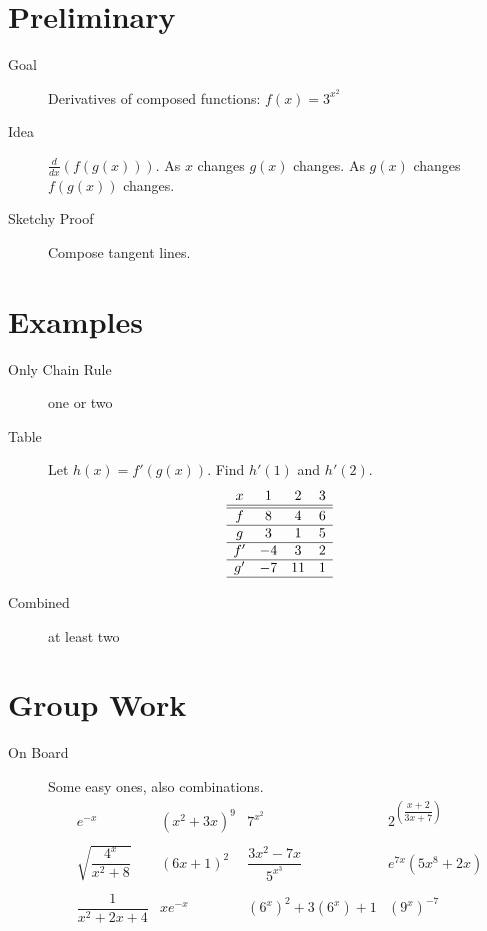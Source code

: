 \documentclass[11pt]{article}
\newcommand{\ds}{\displaystyle}
\begin{document}
\drawtitle

\section*{Preliminary}
\begin{description}
\item[Goal] Derivatives of composed functions: $f(x)=3^{x^2}$
\item[Idea] $\ds\frac{d}{dx}(f(g(x)))$.  As $x$ changes $g(x)$
  changes.  As $g(x)$ changes $f(g(x))$ changes.
\item[Sketchy Proof] Compose tangent lines.
\end{description}

\section*{Examples}
\begin{description}
\item[Only Chain Rule] one or two
\item[Table]   Let $h(x) = f'(g(x))$. Find $h'(1)$ and $h'(2)$.
  \[
  \begin{array}{cccc}
    x & 1 & 2 & 3\\ \hline\hline
    f & 8 & 4 & 6\\ \hline
    g & 3 & 1 & 5\\ \hline
    f' & -4 & 3 & 2\\ \hline
    g' & -7 & 11 & 1\\ \hline
  \end{array}
  \]
\item[Combined] at least two
\end{description}

\section*{Group Work}
\begin{description}
\item[On Board] Some easy ones, also combinations.
  \[
  \begin{array}{cccc}
    e^{-x} & (x^2 + 3x)^9 & 7^{x^2} & 2^{\left(\dfrac{x+2}{3x+7}\right)} \\
    \\
    \sqrt{\dfrac{4^x}{x^2+8}} & (6x+1)^2 & \dfrac{3x^2 - 7x}{5^{x^3}} & e^{7x}(5x^8+2x)\\
    \\
    \dfrac{1}{x^2+2x+4} & xe^{-x} & \left(6^x\right)^2 + 3\left(6^x\right) + 1 & (9^x)^{-7} 
  \end{array}
  \]
\end{description}
\end{document}
